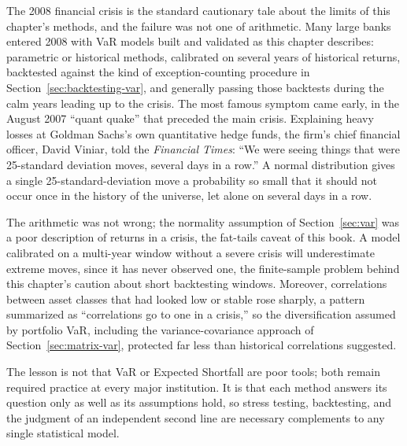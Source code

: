 \documentclass[../ai_in_finance]{subfiles}
\begin{document}
The 2008 financial crisis is the standard cautionary tale about the limits of this chapter's methods, and the failure was not one of arithmetic. Many large banks entered 2008 with VaR models built and validated as this chapter describes: parametric or historical methods, calibrated on several years of historical returns, backtested against the kind of exception-counting procedure in Section~\ref{sec:backtesting-var}, and generally passing those backtests during the calm years leading up to the crisis.
The most famous symptom came early, in the August 2007 ``quant quake'' that preceded the main crisis. Explaining heavy losses at Goldman Sachs's own quantitative hedge funds, the firm's chief financial officer, David Viniar, told the \emph{Financial Times}: ``We were seeing things that were 25-standard deviation moves, several days in a row.'' A normal distribution gives a single 25-standard-deviation move a probability so small that it should not occur once in the history of the universe, let alone on several days in a row.

The arithmetic was not wrong; the normality assumption of Section~\ref{sec:var} was a poor description of returns in a crisis, the fat-tails caveat of this book. A model calibrated on a multi-year window without a severe crisis will underestimate extreme moves, since it has never observed one, the finite-sample problem behind this chapter's caution about short backtesting windows.
Moreover, correlations between asset classes that had looked low or stable rose sharply, a pattern summarized as ``correlations go to one in a crisis,'' so the diversification assumed by portfolio VaR, including the variance-covariance approach of Section~\ref{sec:matrix-var}, protected far less than historical correlations suggested.

The lesson is not that VaR or Expected Shortfall are poor tools; both remain required practice at every major institution. It is that each method answers its question only as well as its assumptions hold, so stress testing, backtesting, and the judgment of an independent second line are necessary complements to any single statistical model.
\end{document}
